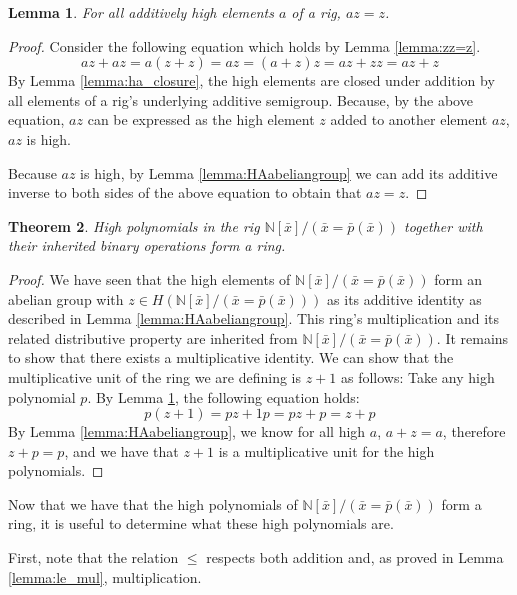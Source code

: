 \documentclass{msthesis}
\newtheorem{theorem}{Theorem}[section]
\newtheorem{lemma}[theorem]{Lemma}
\theoremstyle{definition}
\newcommand{\nat}{\mathbb{N}}
\begin{document}
\begin{lemma}\label{lemma:az=z}
    For all additively high elements $a$ of a rig, $az = z$.
\end{lemma}
\begin{proof}
    Consider the following equation which holds by Lemma \ref{lemma:zz=z}.
    \[ az + az = a(z + z) = az = (a + z)z = az + zz = az + z\]
    By Lemma \ref{lemma:ha_closure}, the high elements are closed under addition by all elements of a rig's underlying additive semigroup.  Because, by the above equation, $az$ can be expressed as the high element $z$ added to another element $az$, $az$ is high.

    Because $az$ is high, by Lemma \ref{lemma:HAabeliangroup} we can add its additive inverse to both sides of the above equation to obtain that $az = z$.
\end{proof}

\begin{theorem}\label{thm:highring}
    High polynomials in the rig $\nat[\bar{x}]/(\bar{x}=\bar{p}(\bar{x}))$ together with their inherited binary operations form a ring.
\end{theorem}

\begin{proof}
    We have seen that the high elements of $\nat[\bar{x}]/(\bar{x}=\bar{p}(\bar{x}))$ form an abelian group with $z \in H(\nat[\bar{x}]/(\bar{x}=\bar{p}(\bar{x})))$ as its additive identity as described in Lemma \ref{lemma:HAabeliangroup}. This ring's multiplication and its related distributive property are inherited from $\nat[\bar{x}]/(\bar{x}=\bar{p}(\bar{x}))$.  It remains to show that there exists a multiplicative identity.
    We can show that the multiplicative unit of the ring we are defining is $z + 1$ as follows:
    Take any high polynomial $p$. By Lemma \ref{lemma:az=z}, the following equation holds:
    \[ p(z + 1) = pz + 1p = pz + p = z + p \]
    By Lemma \ref{lemma:HAabeliangroup}, we know for all high $a$, $a + z = a$, therefore $z + p = p$, and we have that $z + 1$ is a multiplicative unit for the high polynomials.
\end{proof}

Now that we have that the high polynomials of $\nat[\bar{x}]/(\bar{x}=\bar{p}(\bar{x}))$ form a ring, it is useful to determine what these high polynomials are.

First, note that the relation $\le$ respects both addition and, as proved in Lemma \ref{lemma:le_mul}, multiplication.
\end{document}
